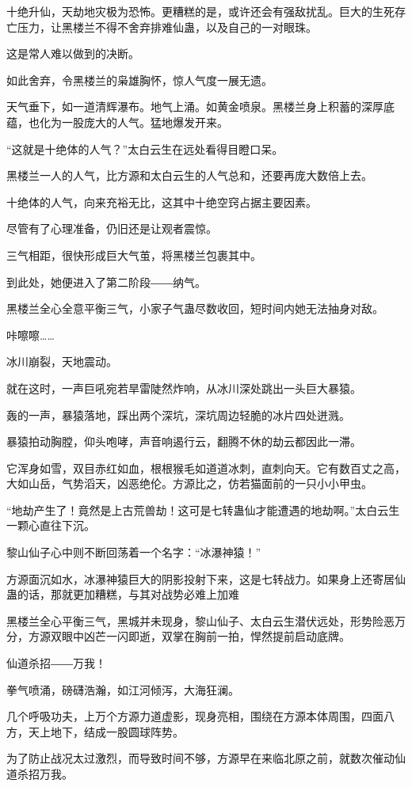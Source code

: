 \begin{this_body}
十绝升仙，天劫地灾极为恐怖。更糟糕的是，或许还会有强敌扰乱。巨大的生死存亡压力，让黑楼兰不得不舍弃排难仙蛊，以及自己的一对眼珠。

这是常人难以做到的决断。

如此舍弃，令黑楼兰的枭雄胸怀，惊人气度一展无遗。

天气垂下，如一道清辉瀑布。地气上涌。如黄金喷泉。黑楼兰身上积蓄的深厚底蕴，也化为一股庞大的人气。猛地爆发开来。

“这就是十绝体的人气？”太白云生在远处看得目瞪口呆。

黑楼兰一人的人气，比方源和太白云生的人气总和，还要再庞大数倍上去。

十绝体的人气，向来充裕无比，这其中十绝空窍占据主要因素。

尽管有了心理准备，仍旧还是让观者震惊。

三气相距，很快形成巨大气茧，将黑楼兰包裹其中。

到此处，她便进入了第二阶段――纳气。

黑楼兰全心全意平衡三气，小家子气蛊尽数收回，短时间内她无法抽身对敌。

咔嚓嚓……

冰川崩裂，天地震动。

就在这时，一声巨吼宛若旱雷陡然炸响，从冰川深处跳出一头巨大暴猿。

轰的一声，暴猿落地，踩出两个深坑，深坑周边轻脆的冰片四处迸溅。

暴猿拍动胸膛，仰头咆哮，声音响遏行云，翻腾不休的劫云都因此一滞。

它浑身如雪，双目赤红如血，根根猴毛如道道冰刺，直刺向天。它有数百丈之高，大如山岳，气势滔天，凶恶绝伦。方源比之，仿若猫面前的一只小小甲虫。

“地劫产生了！竟然是上古荒兽劫！这可是七转蛊仙才能遭遇的地劫啊。”太白云生一颗心直往下沉。

黎山仙子心中则不断回荡着一个名字：“冰瀑神猿！”

方源面沉如水，冰瀑神猿巨大的阴影投射下来，这是七转战力。如果身上还寄居仙蛊的话，那就更加糟糕，与其对战势必难上加难

黑楼兰全心平衡三气，黑城并未现身，黎山仙子、太白云生潜伏远处，形势险恶万分，方源双眼中凶芒一闪即逝，双掌在胸前一拍，悍然提前启动底牌。

仙道杀招――万我！

拳气喷涌，磅礴浩瀚，如江河倾泻，大海狂澜。

几个呼吸功夫，上万个方源力道虚影，现身亮相，围绕在方源本体周围，四面八方，天上地下，结成一股圆球阵势。

为了防止战况太过激烈，而导致时间不够，方源早在来临北原之前，就数次催动仙道杀招万我。


\end{this_body}
